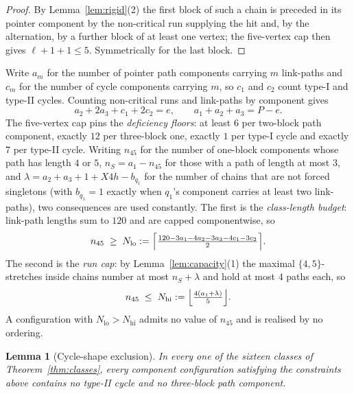\documentclass[10pt]{article}
\newtheorem{lemma}[theorem]{Lemma}
\theoremstyle{remark}
\theoremstyle{plain}
\begin{document}
\begin{proof}
By Lemma~\ref{lem:rigid}(2) the first block of such a chain is preceded
in its pointer component by the non-critical run supplying the hit and,
by the alternation, by a further block of at least one vertex; the
five-vertex cap then gives $\ell+1+1\le 5$.  Symmetrically for the last
block.
\end{proof}

Write $a_m$ for the number of pointer path components carrying $m$
link-paths and $c_m$ for the number of cycle components carrying $m$,
so $c_1$ and $c_2$ count type-I and type-II cycles.  Counting
non-critical runs and link-paths by component gives
\begin{equation}\label{eq:Ib}
a_2+2a_3+c_1+2c_2=e,
\qquad
a_1+a_2+a_3=P-e .
\end{equation}
The five-vertex cap pins the \emph{deficiency floors}: at least $6$ per
two-block path component, exactly $12$ per three-block one, exactly $1$
per type-I cycle and exactly $7$ per type-II cycle.  Writing $n_{45}$
for the number of one-block components whose path has length $4$ or
$5$, $n_S=a_1-n_{45}$ for those with a path of length at most $3$, and
$\lambda=a_2+a_3+1+X4h-b_{q_1}$ for the number of chains that are not
forced singletons (with $b_{q_1}=1$ exactly when $q_1$'s component
carries at least two link-paths), two consequences are used constantly.
The first is the \emph{class-length budget}: link-path lengths sum to
$120$ and are capped componentwise, so
\begin{equation}\label{eq:Nlo}
n_{45}\;\ge\;N_{\mathrm{lo}}:=
\Bigl\lceil \tfrac{120-3a_1-4a_2-3a_3-4c_1-3c_2}{2}\Bigr\rceil .
\end{equation}
The second is the \emph{run cap}: by Lemma~\ref{lem:capacity}(1) the
maximal $\{4,5\}$-stretches inside chains number at most $n_S+\lambda$
and hold at most $4$ paths each, so
\begin{equation}\label{eq:Nhi}
n_{45}\;\le\;N_{\mathrm{hi}}:=
\Bigl\lfloor \tfrac{4(a_1+\lambda)}{5}\Bigr\rfloor .
\end{equation}
A configuration with $N_{\mathrm{lo}}>N_{\mathrm{hi}}$ admits no value
of $n_{45}$ and is realised by no ordering.

\begin{lemma}[Cycle-shape exclusion]\label{lem:c2z}
In every one of the sixteen classes of Theorem~\ref{thm:classes},
every component configuration satisfying the constraints above contains
no type-II cycle and no three-block path component.
\end{lemma}
\end{document}
